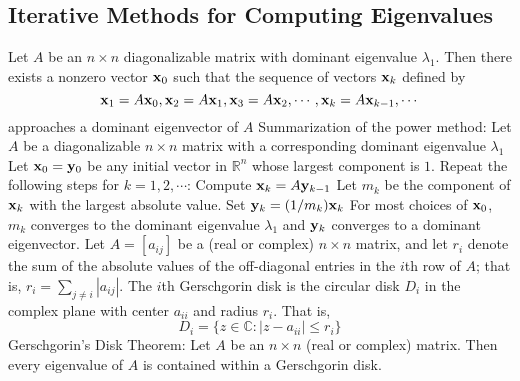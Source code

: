 \documentclass{article}
\begin{document}
    \subsection{Iterative Methods for Computing Eigenvalues}
    \begin{outline}
        \1 Let \(A\) be an \(n\times n\) diagonalizable matrix with dominant eigenvalue \(\lambda_1\). Then there exists a nonzero vector \(\vb x_0\) such that the sequence of vectors \(\vb x_k\) defined by \[\vb x_1=A\vb x_0,\vb x_2=A\vb x_1,\vb x_3=A\vb x_2,\cdots,\vb x_k=A\vb x_{k-1},\cdots\] approaches a dominant eigenvector of $A$
        \1 Summarization of the power method: Let \(A\) be a diagonalizable \(n\times n\) matrix with a corresponding dominant eigenvalue \(\lambda_1\)
            \2 Let \(\vb x_0=\vb y_0\) be any initial vector in \(\mathbb R^n\) whose largest component is \(1\). 
            \2 Repeat the following steps for \(k=1,2,\cdots\):
                \3 Compute \(\vb x_k=A\vb y_{k-1}\)
                \3 Let \(m_k\) be the component of \(\vb x_k\) with the largest absolute value. 
                \3 Set \(\vb y_k=(1/m_k)\vb x_k\)
        \1 For most choices of \(\vb x_0\), \(m_k\) converges to the dominant eigenvalue \(\lambda_1\) and \(\vb y_k\) converges to a dominant eigenvector. 
        \1 Let \(A=[a_{ij}]\) be a (real or complex) \(n\times n\) matrix, and let \(r_i\) denote the sum of the absolute values of the off-diagonal entries in the $i$th row of $A$; that is, \(r_i=\sum_{j\neq i}|a_{ij}|\). The $i$th Gerschgorin disk is the circular disk $D_i$ in the complex plane with center \(a_{ii}\) and radius \(r_i\). That is, \[D_i=\{z\in\mathbb C:|z-a_{ii}|\leq r_i\}\]
        \1 Gerschgorin's Disk Theorem: Let \(A\) be an \(n\times n\) (real or complex) matrix. Then every eigenvalue of $A$ is contained within a Gerschgorin disk. 
    \end{outline}
    
\end{document}
